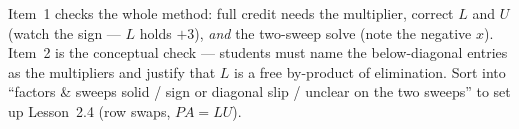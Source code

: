 \documentclass[10pt]{article}
\begin{document}
\begin{teachernote}
Item~1 checks the whole method: full credit needs the multiplier, correct $L$ and $U$ (watch the sign
--- $L$ holds $+3$), \emph{and} the two-sweep solve (note the negative $x$). Item~2 is the conceptual
check --- students must name the below-diagonal entries as the multipliers and justify that $L$ is a
free by-product of elimination. Sort into ``factors \& sweeps solid / sign or diagonal slip / unclear
on the two sweeps'' to set up Lesson~2.4 (row swaps, $PA=LU$).
\end{teachernote}
\end{document}
